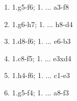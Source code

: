\begin{enumerate}
\setcounter{enumi}{\value{d_counter}}
\item 1.\bishop{}g5-f6\mate{}; 1. ... \bishop{}a3-f8\mate{}
\item 1.\bishop{}g6-h7\mate{}; 1. ... \bishop{}h8-d4\mate{}
\item 1.\bishop{}d8-f6\mate{}; 1. ... \bishop{}e6-b3\mate{}
\item 1.\bishop{}c8-f5\mate{}; 1. ... \bishop{}e3xd4\mate{}
\item 1.\bishop{}h4-f6\mate{}; 1. ... \bishop{}c1-e3\mate{}
\item 1.\bishop{}g5-f4\mate{}; 1. ... \bishop{}a8-f3\mate{}
\setcounter{d_counter}{\value{enumi}}
\end{enumerate}